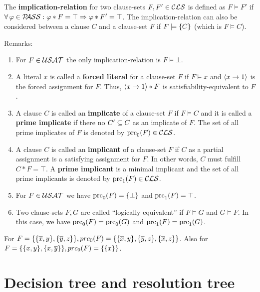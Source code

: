 \documentclass{report}
\begin{document}
\begin{defi}\label{def:imp-rel}
The \textbf{implication-relation} for two clause-sets $F, F' \in \mathcal{CLS}$ is defined as $F \models F'$ if $\forall\, \varphi \in \mathcal{P\hspace{-0.32em}ASS} : \varphi * F = \top \Rightarrow \varphi * F' = \top$. The implication-relation can also be considered between a clause $C$ and a clause-set $F$ if $F \models \{ C \}$ (which is $F \models C$).
\end{defi}
Remarks:
  \begin{enumerate}
  \item For  $F \in \mathcal{USAT}$ the only implication-relation is $F \models \bot$.
  \item A literal $x$ is called a \textbf{forced literal} for a clause-set $F$ if $F \models x$ and $\langle x \rightarrow 1 \rangle$ is the forced assignment for $F$. Thus,  $\langle x \rightarrow 1 \rangle * F$ is satisfiability-equivalent to $F$.
  \item A clause $C$ is called an \textbf{implicate} of a clause-set $F$ if $F \models C$ and it is called a \textbf{prime implicate} if there no $ C' \subseteq C$ as an implicate of $F$. The set of all prime implicates of $F$ is denoted by $\operatorname{prc}_0(F) \in \mathcal{CLS}$.
  \item A clause $C$ is called an \textbf{implicant} of a clause-set $F$ if $C$ as a partial assignment is a satisfying assignment for $F$. In other words, $C$ must fulfill $C * F=\top$. A \textbf{prime implicant} is a minimal implicant and the set of all prime implicants is denoted by $\operatorname{prc}_1(F) \in \mathcal{CLS}$. 
  \item For $F \in \mathcal{USAT}$ we have $\operatorname{prc}_0(F) = \{ \bot \}$ and $\operatorname{prc}_1(F) = \top$.
  \item Two clause-sets $F, G$ are called ``logically equivalent'' if $F \models G$ and $G \models F$. In this case, we have $\operatorname{prc}_0(F) = \operatorname{prc}_0(G)$ and $\operatorname{prc}_1(F) = \operatorname{prc}_1(G)$.
  \end{enumerate}

\begin{examp}\label{exp:bbb}
For $F = \{\{ \overline x, y\} , \{ \overline y, z\}\}, prc_0(F) = \{\{\overline x, y\} , \{\overline y, z\} , \{\overline x, z\}\}$. Also for $F = \{ \{ x, y \} , \{ x,\overline y \} \}, prc_0(F) = \{ \{ x \} \}$.
\end{examp}
\section{Decision tree and resolution tree}
\label{sec:trees}
\end{document}
